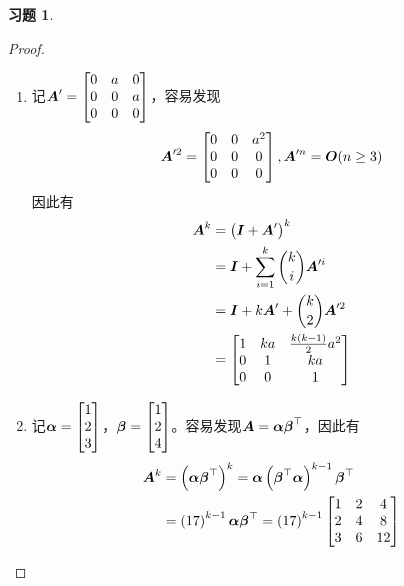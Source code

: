 \documentclass{ctexart}
\newtheorem{problem}{习题}[section]
\begin{document}
\setcounter{problem}{21}
\begin{problem}
\end{problem}
\begin{proof}
    \begin{enumerate}
        \item 记\(\boldsymbol{A}'=\begin{bmatrix}0&a&0\\0&0&a\\0&0&0\end{bmatrix}\)，容易发现
              \begin{equation*}
                  \boldsymbol{A}'^2=\begin{bmatrix}0&0&a^2\\0&0&0\\0&0&0\end{bmatrix},\boldsymbol{A}'^n=\boldsymbol{O}(n\ge3)
              \end{equation*}
              因此有
              \begin{align*}
                  \boldsymbol{A}^k & =\left( \boldsymbol{I}+\boldsymbol{A}' \right)^k                 \\
                          & =\boldsymbol{I}+\sum_{i=1}^k\binom{k}{i}\boldsymbol{A}'^i \\
                          & =\boldsymbol{I}+k\boldsymbol{A}'+\binom{k}{2}\boldsymbol{A}'^2     \\
                          & =\begin{bmatrix}
                      1 & ka & \frac{k(k-1)}{2}a^2 \\
                      0 & 1  & ka                  \\
                      0 & 0  & 1
                  \end{bmatrix}
              \end{align*}
        \item 记\(\boldsymbol{\alpha}=\begin{bmatrix}1\\2\\3\end{bmatrix}\)，\(\boldsymbol{\beta}=\begin{bmatrix}1\\2\\4\end{bmatrix}\)。容易发现\(\boldsymbol{A}=\boldsymbol{\alpha}\boldsymbol{\beta}^\top\)，因此有
              \begin{align*}
                  \boldsymbol{A}^k & =\left( \boldsymbol{\alpha}\boldsymbol{\beta}^\top \right)^k=\boldsymbol{\alpha}\left( \boldsymbol{\beta}^\top\boldsymbol{\alpha} \right)^{k-1}\boldsymbol{\beta}^\top \\
                          & =\left( 17 \right)^{k-1}\boldsymbol{\alpha}\boldsymbol{\beta}^\top=\left( 17 \right)^{k-1}
                  \begin{bmatrix}
                      1 & 2 & 4 \\2&4&8\\3&6&12
                  \end{bmatrix}
              \end{align*}
    \end{enumerate}
\end{proof}
\end{document}
